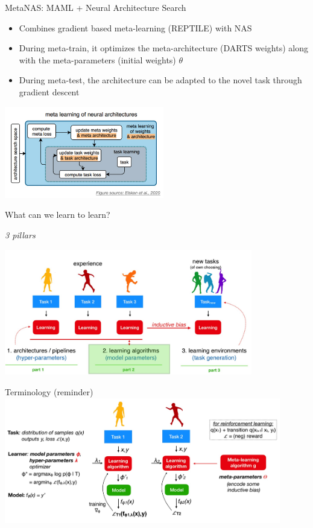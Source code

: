 \documentclass[aspectratio=169,t,handout,xcolor={usenames,dvipsnames}]{beamer}
\begin{document}
\begin{frame}{MetaNAS: MAML + Neural Architecture Search}
    \begin{itemize}
        \item Combines gradient based meta-learning (REPTILE) with NAS
        \item During meta-train, it optimizes the meta-architecture (DARTS weights) along with the meta-parameters (initial weights) $\theta$
        \item During meta-test, the architecture can be adapted to the novel task through gradient descent
    \end{itemize}
    \centering\includegraphics[height=4cm]{image/Jietu20220328-235920.jpg}
\end{frame}


\begin{frame}{What can we learn to learn?}
    \centerline{\textit{3 pillars}}
    \centering\includegraphics[height=5.5cm]{image/Jietu20220329-000132.jpg}
\end{frame}

\begin{frame}{Terminology (reminder)}
    \centering\includegraphics[height=5.5cm]{image/Jietu20220329-000340.jpg}
\end{frame}
\end{document}

